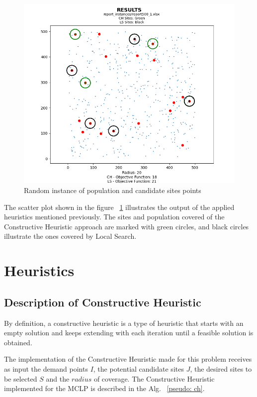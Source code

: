 \documentclass[11pt, a4paper]{article}
\begin{document}
\begin{figure}[h]
	\centering
	\includegraphics[scale=0.8]{example_instance_output.png}
	\caption{Random instance of population and candidate sites points}
	\label{fig:example_instance_output}
\end{figure}

The scatter plot shown in the figure ~\ref{fig:example_instance_output} illustrates the output of the applied heuristics mentioned previously. The sites and population covered of the Constructive Heuristic approach are marked with green circles, and black circles illustrate the ones covered by Local Search. 

\section{Heuristics}\label{sec:exp}

\subsection{Description of Constructive Heuristic}
By definition, a constructive heuristic is a type of heuristic that starts with an empty solution and keeps extending with each iteration until a feasible solution is obtained.

The implementation of the Constructive Heuristic made for this problem receives as input the demand points $I$, the potential candidate sites $J$, the desired sites to be selected $S$ and the $radius$ of coverage.
The Constructive Heuristic implemented for the MCLP is described in the Alg. ~\ref{pseudo: ch}.
\end{document}
